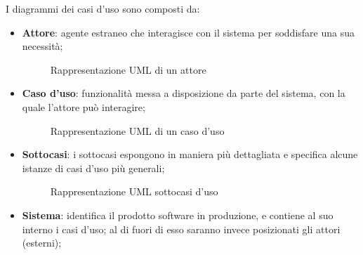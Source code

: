 I diagrammi dei casi d'uso sono composti da:\\
\begin{itemize}
    \item \textbf{Attore}: agente estraneo che interagisce con il sistema per soddisfare una sua necessità;
        \begin{figure}[H]
            \centering
            \caption{Rappresentazione UML di un attore}
            \label{fig:Rappresentazione UML di un attore}
        \end{figure}
    \item \textbf{Caso d'uso}: funzionalità messa a disposizione da parte del sistema, con la quale l'attore può interagire;
        \begin{figure}[H]
        \centering
        \caption{Rappresentazione UML di un caso d'uso}
        \label{fig:Rappresentazione UML di un caso d'uso}
        \end{figure}
    \item \textbf{Sottocasi}: i sottocasi espongono in maniera più dettagliata e specifica alcune istanze di casi d'uso più generali; 
    \begin{figure}[H]
        \centering
        \caption{Rappresentazione UML sottocasi d'uso}
        \label{fig:Rappresentazione UML sottocasi d'uso}
    \end{figure}
    \item \textbf{Sistema}: identifica il prodotto software in produzione, e contiene al suo interno i casi d'uso; al di fuori di esso saranno invece posizionati gli attori (esterni);

\end{itemize}
